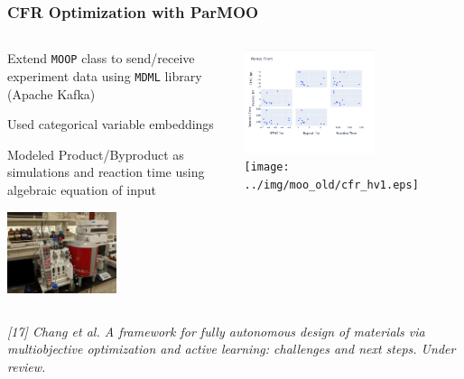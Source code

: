 \documentclass[aspectratio=169]{beamer}
\begin{document}
\begin{frame}\frametitle{CFR Optimization with ParMOO}

\begin{columns}
\begin{column}{0.5\textwidth}

\medskip
Extend {\tt MOOP} class to send/receive experiment data
using {\tt MDML} library (Apache Kafka)

\medskip
Used categorical variable embeddings

\medskip
Modeled Product/Byproduct as simulations and reaction time using algebraic
equation of input

\begin{center}
\includegraphics[width=0.5\textwidth]{../img/probs/cfr-nmr-setup.jpg}\\
\end{center}
\end{column}
\begin{column}{0.5\textwidth}
\begin{center}
\includegraphics[width=0.6\textwidth]{../img/moo_new/cfr_pareto_front.png}\\
\texttt{[image: ../img/moo\_old/cfr\_hv1.eps]}
\end{center}
\end{column}
\end{columns}

\vfill

{\tiny\it
[17] Chang et al.
A framework for fully autonomous design of materials via multiobjective optimization and active learning: challenges and next steps.
Under review.\\
}

\end{frame}
\end{document}
